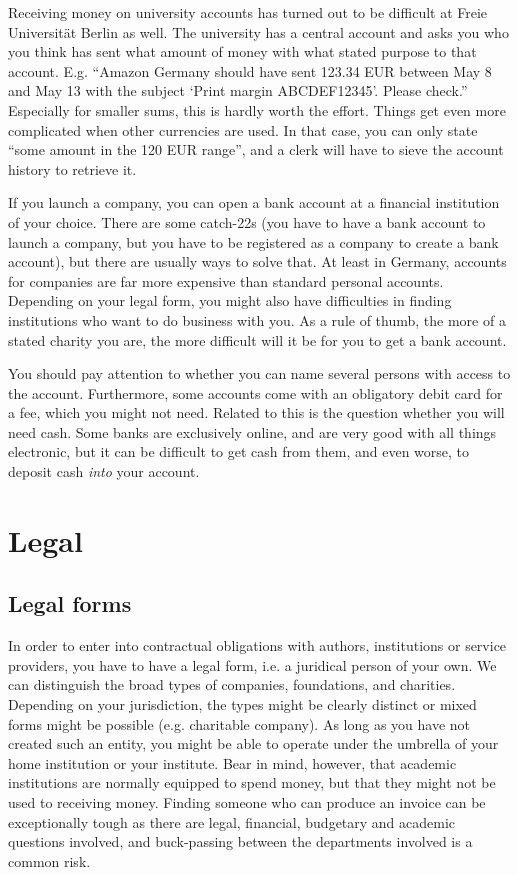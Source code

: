 \documentclass[nonflat,modfonts,output=book] {langsci/langscibook}
\begin{document}
Receiving money on university accounts has turned out to be difficult at Freie Universität Berlin as well. The university has a central account and asks you who you think has sent what amount of money with what stated purpose to that account. E.g. ``Amazon Germany should have sent 123.34 EUR between May 8 and May 13 with the subject `Print margin ABCDEF12345'. Please check.'' Especially for smaller sums, this is hardly worth the effort. Things get even more complicated when other currencies are used. In that case, you can only state ``some amount in the 120 EUR range'', and a clerk will have to sieve the account history to retrieve it. 

If you launch a company, you can open a bank account at a financial institution of your choice. There are some catch-22s (you have to have a bank account to launch a company, but you have to be registered as a company to create a bank account), but there are usually ways to solve that. At least in Germany, accounts for companies are far more expensive than standard personal accounts. Depending on your legal form, you might also have difficulties in finding institutions who want to do business with you. As a rule of thumb, the more of a stated charity you are, the more difficult will it be for you to get a bank account. 

You should pay attention to whether you can name several persons with access to the account. Furthermore, some accounts come with an obligatory debit card for a fee, which you might not need.
Related to this is the question whether you will need cash. Some banks are exclusively online, and are very good with all things electronic, but it can be difficult to get cash from them, and even worse, to deposit cash \textit{into} your account. 


\section{Legal}\label{sec:legal}
\subsection{Legal forms}\label{sec:legalform}
In order to enter into contractual obligations with authors, institutions or service providers, you have to have a legal form, i.e. a juridical person of your own. We can distinguish the broad types of companies, foundations, and charities. Depending on your jurisdiction, the types might be clearly distinct or mixed forms might be possible (e.g. charitable company). As long as you have not created such an entity, you might be able to operate under the umbrella of your home institution or your institute. Bear in mind, however, that academic institutions are normally equipped to spend money, but that they might not be used to receiving money. Finding someone who can produce an invoice can be exceptionally tough as there are legal, financial, budgetary and academic questions involved, and buck-passing between the departments involved is a common risk. 
\end{document}
